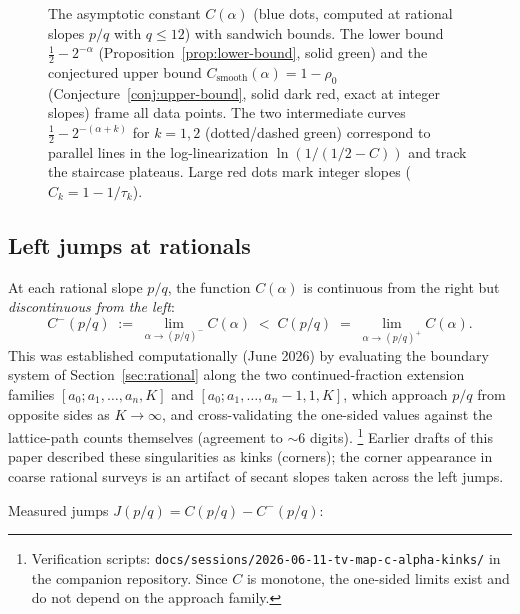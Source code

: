 \documentclass[11pt]{article}
\theoremstyle{definition}
\theoremstyle{remark}
\begin{document}
\begin{figure}[ht]
\caption{The asymptotic constant $C(\alpha)$ (blue dots, computed at
rational slopes $p/q$ with $q \leq 12$) with sandwich bounds.
The lower bound $\tfrac{1}{2} - 2^{-\alpha}$
(Proposition~\ref{prop:lower-bound}, solid green) and the
conjectured upper bound $C_{\mathrm{smooth}}(\alpha) = 1 - \rho_0$
(Conjecture~\ref{conj:upper-bound}, solid dark red, exact at
integer slopes) frame all data points.
The two intermediate curves $\tfrac{1}{2} - 2^{-(\alpha+k)}$ for
$k = 1, 2$ (dotted/dashed green) correspond to parallel lines in
the log-linearization $\ln(1/(1/2 - C))$ and track the staircase
plateaus.
Large red dots mark integer slopes
($C_k = 1 - 1/\tau_k$).}
\label{fig:C-alpha}
\end{figure}

\subsection{Left jumps at rationals}\label{subsec:kinks}

At each rational slope $p/q$, the function $C(\alpha)$ is continuous
from the right but \emph{discontinuous from the left}:
\[
C^-(p/q) \;:=\; \lim_{\alpha \to (p/q)^-} C(\alpha)
\;<\; C(p/q) \;=\; \lim_{\alpha \to (p/q)^+} C(\alpha).
\]
This was established computationally (June 2026) by evaluating the
boundary system of Section~\ref{sec:rational} along the two
continued-fraction extension families
$[a_0; a_1, \ldots, a_n, K]$ and $[a_0; a_1, \ldots, a_n{-}1, 1, K]$,
which approach $p/q$ from opposite sides as $K \to \infty$, and
cross-validating the one-sided values against the lattice-path counts
themselves (agreement to ${\sim}6$ digits).%
\footnote{Verification scripts:
\texttt{docs/sessions/2026-06-11-tv-map-c-alpha-kinks/} in the
companion repository. Since $C$ is monotone, the one-sided limits
exist and do not depend on the approach family.}
Earlier drafts of this paper described these singularities as kinks
(corners); the corner appearance in coarse rational surveys is an
artifact of secant slopes taken across the left jumps.

Measured jumps $J(p/q) = C(p/q) - C^-(p/q)$:
\end{document}
